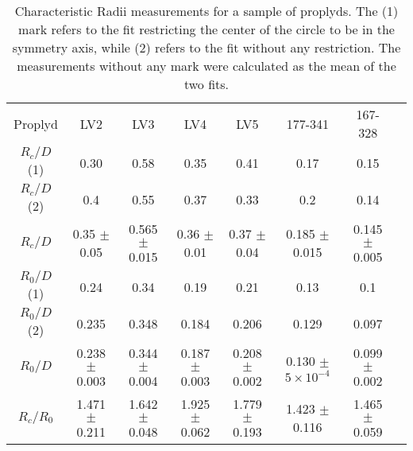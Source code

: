  \begin{table*}
\begin{tabular}{|c|c|c|c|c|c|c|c|}
Proplyd & LV2 & LV3 & LV4  & LV5 & 177-341 & 167-328 \\
$R_c/D$ (1) & 0.30 & 0.58  & 0.35 & 0.41 & 0.17 & 0.15 \\
$R_c/D$ (2) & 0.4 & 0.55 & 0.37 & 0.33 & 0.2 & 0.14    \\
$R_c/D$     & 0.35 $\pm$ 0.05 & 0.565 $\pm$ 0.015 & 0.36  $\pm$ 0.01  & 0.37 $\pm$ 0.04 & 0.185 $\pm$ 0.015 & 0.145 $\pm$ 0.005 \\
$R_0/D$ (1) & 0.24 & 0.34 & 0.19 & 0.21 & 0.13 & 0.1 \\
$R_0/D$ (2) & 0.235 & 0.348  & 0.184 & 0.206 & 0.129 & 0.097 \\
$R_0/D$     & 0.238 $\pm$ 0.003 & 0.344 $\pm$ 0.004 & 0.187 $\pm$ 0.003 & 0.208 $\pm$ 0.002 & 0.130 $\pm$ $5\times 10^{-4}$ & 0.099 $\pm$ 0.002 \\
$R_c/R_0$ & 1.471 $\pm$ 0.211 & 1.642 $\pm$ 0.048 & 1.925 $\pm$ 0.062 & 1.779 $\pm$ 0.193 & 1.423 $\pm$ 0.116 & 1.465 $\pm$ 0.059
\end{tabular}
\caption{Characteristic Radii measurements for a sample of proplyds. The (1) mark refers to the fit restricting
the center of the circle to be in the symmetry axis, while (2) refers to the fit without any restriction. The
measurements without any mark were calculated as the mean of the two fits.}
\end{table*}
